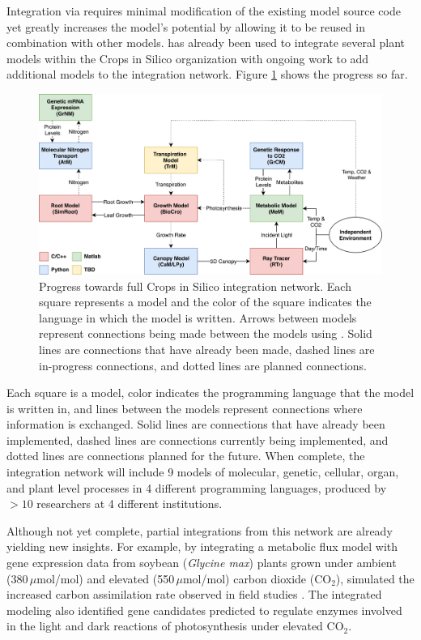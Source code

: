 \documentclass[journal]{IEEEtran}
\newcommand{\todo}[1]{{\color{red}{#1}}}
\newcommand{\pkg}{{\tt \todo{cis\_interface}}{}}
\begin{document}
Integration via {\pkg} requires minimal modification of the existing model source code yet greatly increases the model's potential by allowing it to be reused in combination with other models. {\pkg} has already been used to integrate several plant models within the Crops in Silico organization \citep{Marshall-Colon2017} with ongoing work to add additional models to the integration network. Figure \ref{fig:network} shows the progress so far. 
%
\ifinclfig
 	\begin{figure}[htbp]
	\begin{center}
	\includegraphics[width=\columnwidth,keepaspectratio]{./images/CiS-Languages.png}
	\caption{Progress towards full Crops in Silico integration network. Each square represents a model and the color of the square indicates the language in which the model is written. Arrows between models represent connections being made between the models using {\pkg}. Solid lines are connections that have already been made, dashed lines are in-progress connections, and dotted lines are planned connections.}
	\label{fig:network}
	\end{center}
	\end{figure}
\fi
%
Each square is a model, color indicates the programming language that the model is written in, and lines between the models represent connections where information is exchanged. Solid lines are connections that have already been implemented, dashed lines are connections currently being implemented, and dotted lines are connections planned for the future. When complete, the integration network will include 9 models of molecular, genetic, cellular, organ, and plant level processes in 4 different programming languages, produced by $>10$ researchers at 4 different institutions. 

Although not yet complete, partial integrations from this network are already yielding new insights. For example, by integrating a metabolic flux model  with gene expression data from soybean (\emph{Glycine max}) plants grown under ambient (380\,$\mu$mol/mol) and elevated (550\,$\mu$mol/mol) carbon dioxide (CO$_2$), 
%
\ifieee
	\citep{integration_prep} 
\else
	\citet{integration_prep} 
\fi
%
simulated the increased carbon assimilation rate observed in field studies \citep{Bernacchi2005}. The integrated modeling also identified gene candidates predicted to regulate enzymes involved in the light and dark reactions of photosynthesis under elevated CO$_2$.
\end{document}
